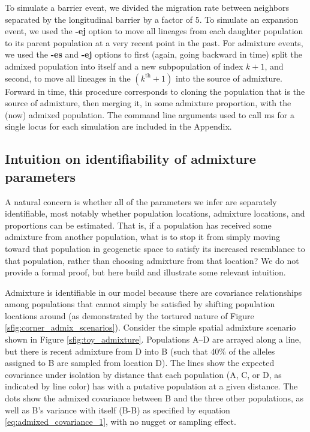 \documentclass[12pt]{article}
\begin{document}
To simulate a barrier event, we divided the migration rate between neighbors separated by the longitudinal barrier by a factor of 5.  To simulate an expansion event, we used the \textbf{-ej} option to move all lineages from each daughter population to its parent population at a very recent point in the past.  For admixture events, we used the \textbf{-es} and \textbf{-ej} options to first (again, going backward in time) split the admixed population into itself and a new subpopulation of index $k + 1$, and second, to move all lineages in the $(k^{\text{th}} + 1)$ into the source of admixture.  Forward in time, this procedure corresponds to cloning the population that is the source of admixture, then merging it, in some admixture proportion, with the (now) admixed population.  The command line arguments used to call ms for a single locus for each simulation are included in the Appendix.

\subsection*{Intuition on identifiability of admixture parameters}
A natural concern is whether all of the parameters we infer are separately identifiable, most notably whether population locations, admixture locations, and proportions can be estimated. That is, if a population has received some admixture from another population, what is to stop it from simply moving toward that population in geogenetic space to satisfy its increased resemblance to that population, rather than choosing admixture from that location?  We do not provide a formal proof, but here build and illustrate some relevant intuition.

Admixture is identifiable in our model because there are covariance relationships among populations that cannot simply be satisfied by shifting population locations around (as demonstrated by the tortured nature of Figure \ref{sfig:corner_admix_scenarios}). 
Consider the simple spatial admixture scenario shown in Figure \ref{sfig:toy_admixture}. 
Populations A--D are arrayed  along a line, but there is recent admixture from D into B (such that 40\% of the alleles assigned to B are sampled from location D).  
The lines show the expected covariance under isolation by distance that each population (A, C, or D, as indicated by line color) has with a putative population at a given distance.  The dots show the admixed covariance between B and the three other populations, as well as B's variance with itself (B-B) as specified by equation \eqref{eq:admixed_covariance_1}, with no nugget or sampling effect.
\end{document}
